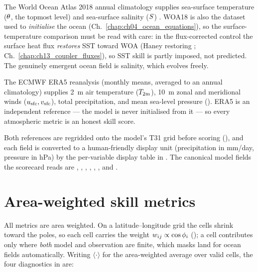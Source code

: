 \begin{description}[leftmargin=1.5em,style=nextline]
  \item[Ocean --- WOA18.] The World Ocean Atlas 2018 annual climatology supplies
  sea-surface temperature ($\theta$, the topmost level) and sea-surface salinity
  ($S$) \citep{locarnini2018woa,zweng2018woa}. WOA18 is also the dataset used to \emph{initialise} the ocean
  (Ch.~\ref{chap:ch04_ocean_equations}), so the surface-temperature comparison
  must be read with care: in the flux-corrected control the surface heat flux
  \emph{restores} SST toward WOA (Haney restoring \citep{haney1971}; Ch.~\ref{chap:ch13_coupler_fluxes}),
  so SST skill is partly imposed, not predicted. The genuinely emergent ocean
  field is salinity, which evolves freely.
  \item[Atmosphere --- ERA5.] The ECMWF ERA5 reanalysis \citep{hersbach2020era5} (monthly means,
  averaged to an annual climatology) supplies 2~m air temperature ($T_{2\mathrm{m}}$),
  10~m zonal and meridional winds ($u_{\mathrm{sfc}},v_{\mathrm{sfc}}$),
  total precipitation, and mean sea-level pressure (). ERA5 is an
  independent reference --- the model is never initialised from it --- so every
  atmospheric metric is an honest skill score.
\end{description}

Both references are regridded onto the model's T31 grid before scoring
(), and each field is converted to a human-friendly
display unit (precipitation in mm/day, pressure in hPa) by the per-variable
display table in . The canonical model fields
the scorecard reads are , , , ,
, , and .

\section{Area-weighted skill metrics}\label{sec:c16_metrics}

All metrics are area weighted. On a latitude--longitude grid the cells shrink
toward the poles, so each cell carries the weight $w_{ij} \propto \cos\phi_i$
(); a cell contributes only where \emph{both} model and
observation are finite, which masks land for ocean fields automatically. Writing
$\langle\cdot\rangle$ for the area-weighted average over valid cells, the four
diagnostics in 
are:

